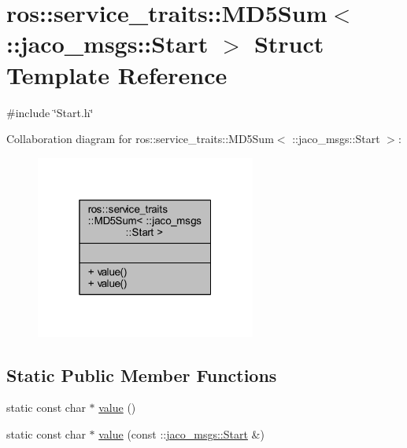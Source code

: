 \hypertarget{structros_1_1service__traits_1_1MD5Sum_3_01_1_1jaco__msgs_1_1Start_01_4}{}\section{ros\+:\+:service\+\_\+traits\+:\+:M\+D5\+Sum$<$ \+:\+:jaco\+\_\+msgs\+:\+:Start $>$ Struct Template Reference}
\label{structros_1_1service__traits_1_1MD5Sum_3_01_1_1jaco__msgs_1_1Start_01_4}


{\ttfamily \#include \char`\"{}Start.\+h\char`\"{}}



Collaboration diagram for ros\+:\+:service\+\_\+traits\+:\+:M\+D5\+Sum$<$ \+:\+:jaco\+\_\+msgs\+:\+:Start $>$\+:
\nopagebreak
\begin{figure}[H]
\begin{center}
\leavevmode
\includegraphics[width=205pt]{d7/dc5/structros_1_1service__traits_1_1MD5Sum_3_01_1_1jaco__msgs_1_1Start_01_4__coll__graph}
\end{center}
\end{figure}
\subsection*{Static Public Member Functions}
\begin{DoxyCompactItemize}
\item 
static const char $\ast$ \hyperlink{structros_1_1service__traits_1_1MD5Sum_3_01_1_1jaco__msgs_1_1Start_01_4_a03e2b8b9bfe2dda64be6f6ae0d32f166}{value} ()
\item 
static const char $\ast$ \hyperlink{structros_1_1service__traits_1_1MD5Sum_3_01_1_1jaco__msgs_1_1Start_01_4_adb016a31161936934c3de9f4c347009e}{value} (const \+::\hyperlink{namespacejaco__msgs_d8/d46/structjaco__msgs_1_1Start}{jaco\+\_\+msgs\+::\+Start} \&)
\end{DoxyCompactItemize}


